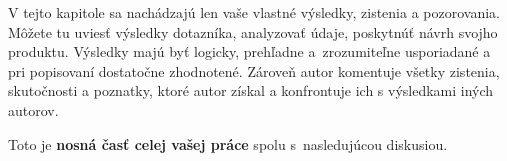 \documentclass[../praca.tex]{subfiles}
\begin{document}
V tejto kapitole sa nachádzajú len vaše vlastné výsledky, zistenia a
pozorovania. Môžete tu uviesť výsledky dotazníka, analyzovať údaje, poskytnúť
návrh svojho produktu. Výsledky majú byť logicky, prehľadne a~zrozumiteľne
usporiadané a pri popisovaní dostatočne zhodnotené. Zároveň autor komentuje
všetky zistenia, skutočnosti a poznatky, ktoré autor získal a konfrontuje ich s
výsledkami iných autorov.

Toto je \textbf{nosná časť celej vašej práce} spolu s~nasledujúcou diskusiou.
\end{document}
